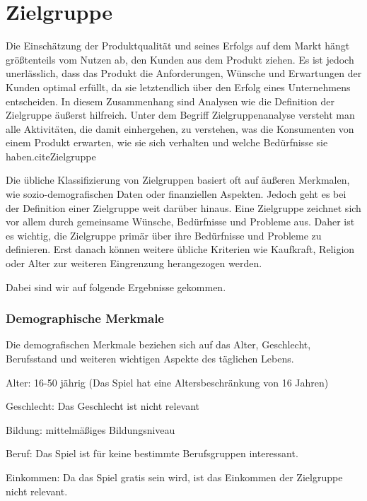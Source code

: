 \usepackage{hyperref}
\section{Zielgruppe}\label{sec:zielgruppe}

\renewcommand{\kapitelautor}{Autor: Nils Hubmann}

%
Die Einschätzung der Produktqualität und seines Erfolgs auf dem Markt hängt größtenteils vom Nutzen ab, den Kunden aus dem Produkt ziehen.
Es ist jedoch unerlässlich, dass das Produkt die Anforderungen, Wünsche und Erwartungen der Kunden optimal erfüllt, da sie letztendlich über den Erfolg eines Unternehmens entscheiden.
In diesem Zusammenhang sind Analysen wie die Definition der Zielgruppe äußerst hilfreich.
Unter dem Begriff Zielgruppenanalyse versteht man alle Aktivitäten, die damit einhergehen, zu verstehen, was die Konsumenten von einem Produkt erwarten, wie sie sich verhalten und welche Bedürfnisse sie haben.cite{Zielgruppe}


Die übliche Klassifizierung von Zielgruppen basiert oft auf äußeren Merkmalen, wie sozio-demografischen Daten oder finanziellen Aspekten.
Jedoch geht es bei der Definition einer Zielgruppe weit darüber hinaus.
Eine Zielgruppe zeichnet sich vor allem durch gemeinsame Wünsche, Bedürfnisse und Probleme aus.
Daher ist es wichtig, die Zielgruppe primär über ihre Bedürfnisse und Probleme zu definieren.
Erst danach können weitere übliche Kriterien wie Kaufkraft, Religion oder Alter zur weiteren Eingrenzung herangezogen werden. 

Dabei sind wir auf folgende Ergebnisse gekommen.

\subsubsection{Demographische Merkmale}\label{subsubsec:Demographische-Merkmale}

Die demografischen Merkmale beziehen sich auf das Alter, Geschlecht, Berufsstand und weiteren wichtigen Aspekte des täglichen Lebens.

\begin{liste}
    \item Alter: 16-50 jährig (Das Spiel hat eine Altersbeschränkung von 16 Jahren)
    \item Geschlecht: Das Geschlecht ist nicht relevant
    \item Bildung: mittelmäßiges Bildungsniveau
    \item Beruf: Das Spiel ist für keine bestimmte Berufsgruppen interessant.
    \item Einkommen: Da das Spiel gratis sein wird, ist das Einkommen der Zielgruppe nicht relevant.
\end{liste}

